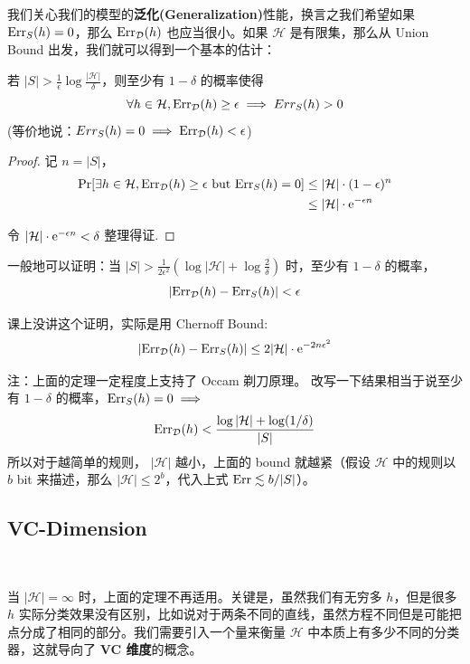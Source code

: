 我们关心我们的模型的\textbf{泛化(Generalization)}性能，换言之我们希望如果 $\text{Err}_S(h) = 0$，那么 $\text{Err}_\mathcal{D}(h)$ 也应当很小。如果 $\mathcal{H}$ 是有限集，那么从 Union Bound 出发，我们就可以得到一个基本的估计：

\begin{theorem}
    若 $|S| > \frac{1}{\epsilon} \log \frac{|\mathcal{H}|}{\delta}$，则至少有 $1-\delta$ 的概率使得
    \[
        \forall h \in \mathcal{H}, \text{Err}_{\mathcal{D}}(h) \ge \epsilon \implies Err_S(h) > 0
    \]
    (等价地说：$Err_S(h)=0 \implies \text{Err}_{\mathcal{D}}(h) < \epsilon$)
\end{theorem}

\begin{proof}
    记 $n=|S|$，
    \begin{align*}
        \Pr[\exists h \in \mathcal{H}, \text{Err}_{\mathcal{D}}(h) \ge \epsilon \text{ but } \text{Err}_S(h)=0] 
        &\le |\mathcal{H}| \cdot (1-\epsilon)^n \\
        &\le |\mathcal{H}| \cdot \mathrm{e}^{-\epsilon n}
    \end{align*}
    
    令 $|\mathcal{H}| \cdot \mathrm{e}^{-\epsilon n} < \delta$ 整理得证.
\end{proof}

一般地可以证明：当 $|S| > \frac{1}{2\epsilon^2} (\log |\mathcal{H}| + \log \frac{2}{\delta})$ 时，至少有 $1-\delta$ 的概率，
\[
    |\text{Err}_{\mathcal{D}}(h) - \text{Err}_S(h)| < \epsilon
\]

课上没讲这个证明，实际是用 Chernoff Bound:
\[
    |\text{Err}_{\mathcal{D}}(h) - \text{Err}_S(h)| \le 2|\mathcal{H}| \cdot \mathrm{e}^{-2n\epsilon^2}
\]

注：上面的定理一定程度上支持了 Occam 剃刀原理。
改写一下结果相当于说至少有 $1-\delta$ 的概率，$\text{Err}_S(h)=0 \implies$
\[
    \text{Err}_{\mathcal{D}}(h) < \frac{\log |\mathcal{H}| + \log(1/\delta)}{|S|}
\]
所以对于越简单的规则， $|\mathcal{H}|$ 越小，上面的 bound 就越紧（假设 $\mathcal{H}$ 中的规则以 $b$ bit 来描述，那么 $|\mathcal{H}| \le 2^b$，代入上式 $\text{Err} \lesssim b/|S|$）。

\subsection{VC-Dimension} ~

当 $|\mathcal{H}| = \infty$ 时，上面的定理不再适用。关键是，虽然我们有无穷多 $h$，但是很多 $h$ 实际分类效果没有区别，比如说对于两条不同的直线，虽然方程不同但是可能把点分成了相同的部分。我们需要引入一个量来衡量 $\mathcal{H}$ 中本质上有多少不同的分类器，这就导向了\textbf{ VC 维度}的概念。

